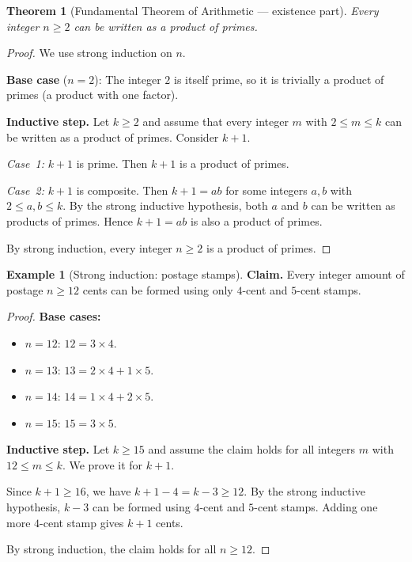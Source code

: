 \documentclass[12pt,a4paper,openany]{book}
\theoremstyle{definition}
\newtheorem{example}[definition]{Example}
\theoremstyle{plain}
\newtheorem{theorem}[definition]{Theorem}
\theoremstyle{remark}
\begin{document}
\begin{theorem}[Fundamental Theorem of Arithmetic --- existence part]
\label{thm:fta-existence}
Every integer $n \geq 2$ can be written as a product of primes.
\end{theorem}

\begin{proof}
We use strong induction on $n$.

\medskip\noindent
\textbf{Base case} ($n = 2$): The integer $2$ is itself prime, so it is trivially
a product of primes (a product with one factor).

\medskip\noindent
\textbf{Inductive step.} Let $k \geq 2$ and assume that every integer
$m$ with $2 \leq m \leq k$ can be written as a product of primes.
Consider $k + 1$.

\emph{Case~1:} $k + 1$ is prime. Then $k+1$ is a product of primes.

\emph{Case~2:} $k + 1$ is composite. Then $k + 1 = ab$ for some integers $a, b$
with $2 \leq a, b \leq k$. By the strong inductive hypothesis, both $a$ and $b$
can be written as products of primes. Hence $k + 1 = ab$ is also a product of primes.

By strong induction, every integer $n \geq 2$ is a product of primes.
\end{proof}

\begin{example}[Strong induction: postage stamps]
\label{ex:stamps}
\textbf{Claim.} Every integer amount of postage $n \geq 12$ cents can be formed
using only $4$-cent and $5$-cent stamps.

\begin{proof}
\textbf{Base cases:}
\begin{itemize}[nosep]
  \item $n = 12$: $12 = 3 \times 4$.
  \item $n = 13$: $13 = 2 \times 4 + 1 \times 5$.
  \item $n = 14$: $14 = 1 \times 4 + 2 \times 5$.
  \item $n = 15$: $15 = 3 \times 5$.
\end{itemize}

\textbf{Inductive step.} Let $k \geq 15$ and assume the claim holds for all integers
$m$ with $12 \leq m \leq k$. We prove it for $k + 1$.

Since $k + 1 \geq 16$, we have $k + 1 - 4 = k - 3 \geq 12$. By the strong inductive
hypothesis, $k - 3$ can be formed using $4$-cent and $5$-cent stamps. Adding one
more $4$-cent stamp gives $k + 1$ cents.

By strong induction, the claim holds for all $n \geq 12$.
\end{proof}
\end{example}
\end{document}
